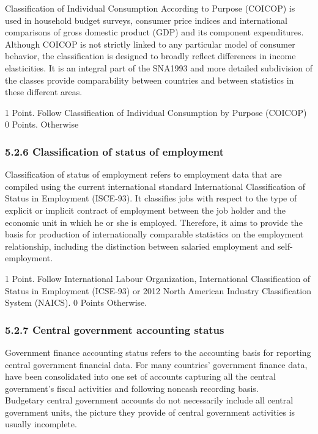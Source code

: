 \documentclass[]{article}
\begin{document}
Classification of Individual Consumption According to Purpose (COICOP)
is used in household budget surveys, consumer price indices and
international comparisons of gross domestic product (GDP) and its
component expenditures.\\
Although COICOP is not strictly linked to any particular model of
consumer behavior, the classification is designed to broadly reflect
differences in income elasticities. It is an integral part of the
SNA1993 and more detailed subdivision of the classes provide
comparability between countries and between statistics in these
different areas.

1 Point. Follow Classification of Individual Consumption by Purpose
(COICOP) 0 Points. Otherwise

\hypertarget{classification-of-status-of-employment}{%
\subsubsection{5.2.6 Classification of status of
employment}\label{classification-of-status-of-employment}}

Classification of status of employment refers to employment data that
are compiled using the current international standard International
Classification of Status in Employment (ISCE-93). It classifies jobs
with respect to the type of explicit or implicit contract of employment
between the job holder and the economic unit in which he or she is
employed. Therefore, it aims to provide the basis for production of
internationally comparable statistics on the employment relationship,
including the distinction between salaried employment and
self-employment.

1 Point. Follow International Labour Organization, International
Classification of Status in Employment (ICSE-93) or 2012 North American
Industry Classification System (NAICS). 0 Points Otherwise.

\hypertarget{central-government-accounting-status}{%
\subsubsection{5.2.7 Central government accounting
status}\label{central-government-accounting-status}}

Government finance accounting status refers to the accounting basis for
reporting central government financial data. For many countries'
government finance data, have been consolidated into one set of accounts
capturing all the central government's fiscal activities and following
noncash recording basis.\\
Budgetary central government accounts do not necessarily include all
central government units, the picture they provide of central government
activities is usually incomplete.
\end{document}
